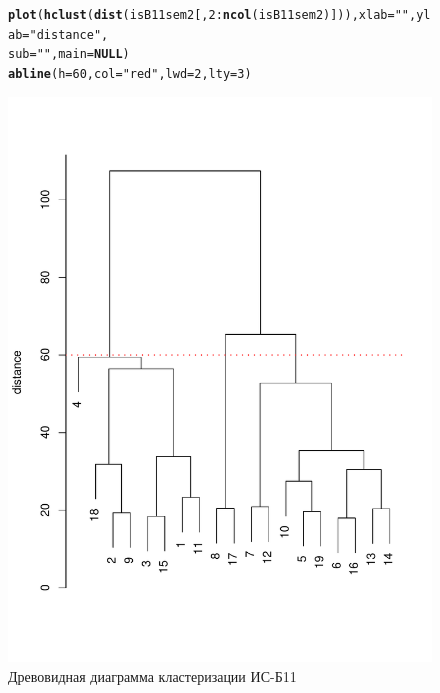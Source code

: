\documentclass[12pt]{article}\usepackage[]{graphicx}\usepackage[]{color}
\makeatletter
\def\maxwidth{ %
  \ifdim\Gin@nat@width>\linewidth
    \linewidth
  \else
    \Gin@nat@width
  \fi
}
\newcommand{\hlnum}[1]{\textcolor[rgb]{0.686,0.059,0.569}{#1}}%
\newcommand{\hlstr}[1]{\textcolor[rgb]{0.192,0.494,0.8}{#1}}%
\newcommand{\hlopt}[1]{\textcolor[rgb]{0,0,0}{#1}}%
\newcommand{\hlstd}[1]{\textcolor[rgb]{0.345,0.345,0.345}{#1}}%
\newcommand{\hlkwa}[1]{\textcolor[rgb]{0.161,0.373,0.58}{\textbf{#1}}}%
\newcommand{\hlkwc}[1]{\textcolor[rgb]{0.333,0.667,0.333}{#1}}%
\newcommand{\hlkwd}[1]{\textcolor[rgb]{0.737,0.353,0.396}{\textbf{#1}}}%
\newenvironment{kframe}{%
 \def\at@end@of@kframe{}%
 \ifinner\ifhmode%
  \def\at@end@of@kframe{\end{minipage}}%
  \begin{minipage}{\columnwidth}%
 \fi\fi%
 \def\FrameCommand##1{\hskip\@totalleftmargin \hskip-\fboxsep
 \colorbox{shadecolor}{##1}\hskip-\fboxsep
     \hskip-\linewidth \hskip-\@totalleftmargin \hskip\columnwidth}%
 \MakeFramed {\advance\hsize-\width
   \@totalleftmargin\z@ \linewidth\hsize
   \@setminipage}}%
 {\par\unskip\endMakeFramed%
 \at@end@of@kframe}
\newenvironment{knitrout}{}{} %
\makeatother
\begin{document}
\begin{figure}[H]
\centering

\begin{knitrout}
\color{fgcolor}\begin{kframe}
\begin{alltt}
\hlkwd{plot}\hlstd{(}\hlkwd{hclust}\hlstd{(}\hlkwd{dist}\hlstd{(isB11sem2[,} \hlnum{2}\hlopt{:}\hlkwd{ncol}\hlstd{(isB11sem2)])),} \hlkwc{xlab}\hlstd{=}\hlstr{""}\hlstd{,} \hlkwc{ylab}\hlstd{=} \hlstr{"distance"}\hlstd{,}
  \hlkwc{sub}\hlstd{=}\hlstr{""}\hlstd{,} \hlkwc{main}\hlstd{=}\hlkwa{NULL}\hlstd{)}
\hlkwd{abline}\hlstd{(}\hlkwc{h}\hlstd{=}\hlnum{60}\hlstd{,} \hlkwc{col}\hlstd{=}\hlstr{"red"}\hlstd{,} \hlkwc{lwd}\hlstd{=}\hlnum{2}\hlstd{,} \hlkwc{lty}\hlstd{=}\hlnum{3}\hlstd{)}
\end{alltt}
\end{kframe}
\includegraphics[width=\maxwidth]{figure/unnamed-chunk-1-1} 

\end{knitrout}
\caption{Древовидная диаграмма кластеризации ИС-Б11}
\label{fig1}

\end{figure}
\end{document}
